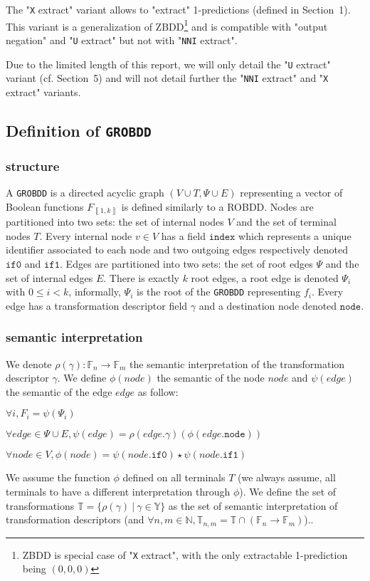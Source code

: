 \documentclass[a4paper,10pt]{article}
\newcommand{\N}{\mathbb{N}}%
\newcommand{\F}{\mathbb{F}}
\newcommand{\Y}{\mathbb{Y}}
\newcommand{\T}{\mathbb{T}}
\newcommand{\uextract}{"\texttt{U} extract"}
\newcommand{\nniextract}{"\texttt{NNI} extract"}
\newcommand{\xextract}{"\texttt{X} extract"}
\newcommand{\GroBdd}{\texttt{GROBDD}}
\newcommand{\fieldIndex}{\texttt{index}}
\newcommand{\fieldNode}{\texttt{node}}
\newcommand{\fieldGamma}{\mathtt{\gamma}}
\newcommand{\fieldThen}{\mathtt{if1}}
\newcommand{\fieldElse}{\mathtt{if0}}
\newcommand{\bras}[1]{{\left\llbracket{#1}\right\rrbracket}}
\begin{document}
The \xextract{} variant allows to "extract" 1-predictions (defined in Section~1).
This variant is a generalization of ZBDD\footnote{ZBDD is special case of \xextract{}, with the only extractable 1-prediction being $(0, 0, 0)$} and is compatible with "output negation" and \uextract{} but not with \nniextract{}.

Due to the limited length of this report, we will only detail the \uextract{} variant (cf. Section~5) and will not detail further the \nniextract{} and \xextract{} variants.



\subsection{Definition of \GroBdd{}}

\subsubsection{structure}

A \GroBdd{} is a directed acyclic graph $(V\cup T, \Psi \cup E)$ representing a vector of Boolean functions $F_\bras{1, k}$ is defined similarly to a ROBDD.
Nodes are partitioned into two sets: the set of internal nodes $V$ and the set of terminal nodes $T$.
Every internal node $v\in V$ has a field $\fieldIndex{}$ which represents a unique identifier associated to each node and two outgoing edges respectively denoted $\fieldElse{}$ and $\fieldThen{}$.
Edges are partitioned into two sets: the set of root edges $\Psi$ and the set of internal edges $E$.
There is exactly $k$ root edges, a root edge is denoted $\Psi_i$ with $0\leq i < k$, informally, $\Psi_i$ is the root of the \GroBdd{} representing $f_i$.
Every edge has a transformation descriptor field $\gamma$ and a destination node denoted $\fieldNode{}$.

\subsubsection{semantic interpretation}
We denote $\rho(\gamma): \F_n \longrightarrow \F_m$ the semantic interpretation of the transformation descriptor $\gamma$.
We define $\phi(node)$ the semantic of the node $node$ and $\psi(edge)$ the semantic of the edge $edge$ as follow: \begin{compactitem}
\item $\forall i, F_i = \psi(\Psi_i)$
\item $\forall edge \in \Psi \cup E, \psi(edge) = \rho(edge.\fieldGamma{})(\phi(edge.\fieldNode{}))$
\item $\forall node \in V, \phi(node) = \psi(node.\fieldElse{}) \star \psi(node.\fieldThen{})$
\end{compactitem}
We assume the function $\phi$ defined on all terminals $T$ (we always assume, all terminals to have a different interpretation through $\phi$).
We define the set of transformations $\T = \{\rho(\gamma)~|~\gamma\in\Y\}$ as the set of semantic interpretation of transformation descriptors (and $\forall n, m\in\N, \T_{n, m} = \T \cap (\F_n \longrightarrow \F_m)$)..
\end{document}
